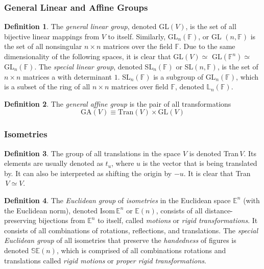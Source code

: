 \documentclass{article}
\theoremstyle{remark}
\theoremstyle{definition}
\newtheorem{definition}{Definition}[section]
\begin{document}
\subsubsection{General Linear and Affine Groups}
\begin{definition}
The \textit{general linear group}, denoted GL$(V)$, is the set of all bijective linear mappings from $V$ to itself. Similarly, GL$_{n}(\mathbb{F})$, or GL $(n, \mathbb{F})$ is the set of all nonsingular $n \times n$ matrices over the field $\mathbb{F}$. Due to the same dimensionality of the following spaces, it is clear that GL$(V) \simeq$ GL$(\mathbb{F}^{n}) \simeq$ GL$_{n}(\mathbb{F})$. The \textit{special linear group}, denoted SL$_{n} (\mathbb{F})$ or SL$(n, \mathbb{F})$, is the set of $n\times n$ matrices a with determinant $1$. SL$_{n}(\mathbb{F})$ is a subgroup of GL$_{n}(\mathbb{F})$, which is a subset of the ring of all $n \times n$ matrices over field $\mathbb{F}$, denoted $\mathbb{L}_{n}(\mathbb{F})$. 
\end{definition}

\begin{definition}
The \textit{general affine group} is the pair of all transformations
\[ \text{GA} (V) \equiv \text{Tran}(V) \times \text{GL}(V)\]
\end{definition}

\subsubsection{Isometries}

\begin{definition}
The group of all translations in the space $V$ is denoted Tran$\,V$. Its elements are usually denoted as $t_{u}$, where $u$ is the vector that is being translated by. It can also be interpreted as shifting the origin by $-u$. It is clear that Tran$\,V \simeq V$. 
\end{definition}

\begin{definition}
The \textit{Euclidean group} of \textit{isometries} in the Euclidean space $\mathbb{E}^{n}$ (with the Euclidean norm), denoted Isom$\, \mathbb{E}^{n}$ or $\mathbb{E}(n)$, consists of all distance-preserving bijections from $\mathbb{E}^{n}$ to itself, called \textit{motions} or \textit{rigid transformations}. It consists of all combinations of rotations, reflections, and translations. The \textit{special Euclidean group} of all isometries that preserve the \textit{handedness} of figures is denoted $\mathbb{SE}(n)$, which is comprised of all combinations rotations and translations called \textit{rigid motions} or \textit{proper rigid transformations}.
\end{definition}
\end{document}
